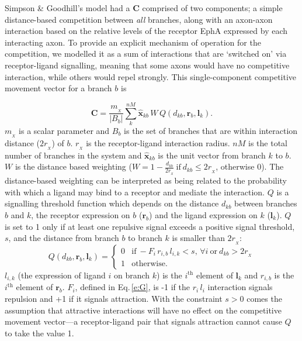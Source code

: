 \documentclass[9pt]{elife} %
\begin{document}
Simpson \& Goodhill's model had a $\mathbf{C}$ comprised of two components; a simple distance-based competition between \emph{all} branches, along with an axon-axon interaction based on the relative levels of the receptor EphA expressed by each interacting axon.
To provide an explicit mechanism of operation for the competition, we modelled it as a sum of interactions that are `switched on' via receptor-ligand signalling, meaning that some axons would have no competitive interaction, while others would repel strongly.
This single-component competitive movement vector for a branch $b$ is

\begin{equation} \label{e:X}
\mathbf{C} = \frac{m_{\!_X}}{|B_{b}|} \sum_k^{nM} \hat{\mathbf{x}}_{kb}\,W\,Q(d_{kb}, \mathbf{r}_{b}, \mathbf{l}_{k}).
\end{equation}
%
$m_{\!_X}$ is a scalar parameter and $B_{b}$ is the set of branches that are within interaction distance ($2 r_{\!_X}$) of $b$. $r_{\!_X}$ is the receptor-ligand interaction radius. $nM$ is the total number of branches in the system and $\hat{\mathbf{x}}_{kb}$ is the unit vector from branch $k$ to $b$.
%
$W$ is the distance based weighting ($W = 1-\frac{d_{kb}}{2r_{\!_X}}~\mathrm{if}~  d_{kb}\leq 2r_{\!_X}$, otherwise $0$).
%
The distance-based weighting can be interpreted as being related to the probability with which a ligand may bind to a receptor and mediate the interaction.
%
$Q$ is a signalling threshold function which depends on the distance $d_{kb}$ between branches $b$ and $k$, the receptor expression on $b$ ($\mathbf{r}_b$) and the ligand expression on $k$ ($\mathbf{l}_k$).
$Q$ is set to 1 only if at least one repulsive signal exceeds a positive signal threshold, $s$, and the distance from branch $b$ to branch $k$ is smaller than $2 r_{\!_X}$:
%
\begin{equation}
Q(d_{kb}, \mathbf{r}_{b}, \mathbf{l}_{k}) = \begin{cases}
                 0 & \mathrm{if}~-F_i\,r_{i,b}\,l_{i,k} <
                 s,\,\forall{i}~\mathrm{or}~d_{kb} > 2r_{\!_X} \\
                 1 & \mathrm{otherwise.}
     \end{cases}
\end{equation}
%
$l_{i,k}$ (the expression of ligand $i$ on branch $k$) is the $i^{\mathrm{th}}$ element of $\mathbf{l}_k$ and $r_{i,b}$ is the $i^{\mathrm{th}}$ element of $\mathbf{r}_b$.
$F_i$, defined in Eq.\,\ref{e:G}, is -1 if the $r_{i}\,l_{i}$ interaction signals repulsion and +1 if it signals attraction.
With the constraint $s>0$ comes the assumption that attractive interactions will have no effect on the competitive movement vector---a receptor-ligand pair that signals attraction cannot cause $Q$ to take the value 1.




\end{document}
